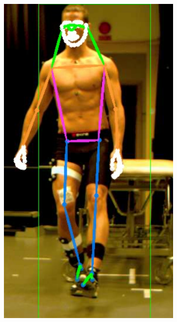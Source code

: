 {\begin{figure}[h]
  \begin{subfigure}[t]{0.22\textwidth}
    \centering
    \includegraphics[height=1.3\textwidth]{files/figs/res/hpe/36-5.png}
    \caption{}
  \end{subfigure}
  ~
  \begin{subfigure}[t]{0.22\textwidth}
    \centering

\end{subfigure}
\end{figure}}
